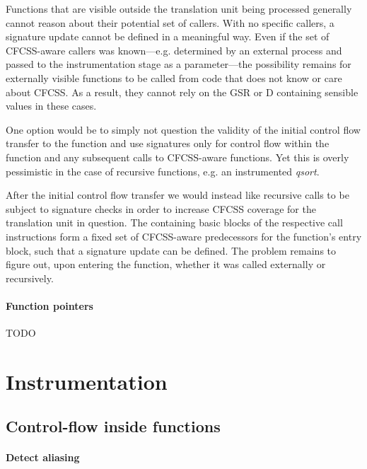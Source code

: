 Functions that are visible outside the translation unit being processed
generally cannot reason about their potential set of callers. With no specific
callers, a signature update cannot be defined in a meaningful way. Even if the
set of CFCSS-aware callers was known—e.g. determined by an external
process and passed to the instrumentation stage as a parameter—the possibility
remains for externally visible functions to be called from code that does not
know or care about CFCSS. As a result, they cannot rely on the GSR or
D containing sensible values in these cases.

One option would be to simply not question the validity of the initial control
flow transfer to the function and use signatures only for control flow within
the function and any subsequent calls to CFCSS-aware functions. Yet this is
overly pessimistic in the case of recursive functions, e.g. an instrumented
\emph{qsort}.

After the initial control flow transfer we would instead like recursive calls
to be subject to signature checks in order to increase CFCSS coverage for the
translation unit in question. The containing basic blocks of the respective
call instructions form a fixed set of CFCSS-aware predecessors for the
function's entry block, such that a signature update can be defined. The
problem remains to figure out, upon entering the function, whether it was
called externally or recursively.


\paragraph{Function pointers} TODO


\section{Instrumentation}


\subsection{Control-flow inside functions}


\paragraph{Detect aliasing}

